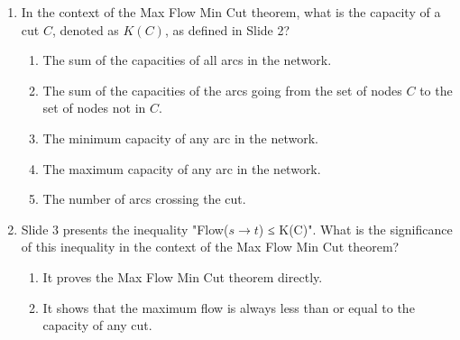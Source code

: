 \documentclass{article}%
\begin{document}
\begin{enumerate}
\begin{enumerate}
\begin{enumerate}
\item By considering the maximum flow and minimum cut capacity explicitly.%
\item By removing the inequality altogether.%
\end{enumerate}%
\vspace{0.5em}%
\item What is the practical significance of the Max Flow Min Cut theorem in solving network flow problems?%
\begin{enumerate}%
\item It simplifies the problem by eliminating the need for linear programming.%
\item It provides an alternative, often more efficient, method for finding the maximum flow compared to directly solving the linear program.%
\item It makes the problem computationally more complex.%
\item It is only applicable to very small networks.%
\item It has no practical significance in solving network flow problems.%
\end{enumerate}%
\vspace{0.5em}%
\end{enumerate}%
\item In the context of the Max Flow Min Cut theorem, what is the capacity of a cut $C$, denoted as $K(C)$, as defined in Slide 2?%
\begin{enumerate}%
\item The sum of the capacities of all arcs in the network.%
\item The sum of the capacities of the arcs going from the set of nodes $C$ to the set of nodes not in $C$.%
\item The minimum capacity of any arc in the network.%
\item The maximum capacity of any arc in the network.%
\item The number of arcs crossing the cut.%
\end{enumerate}%
\vspace{1em}%
\item Slide 3 presents the inequality "Flow($s \to t$) ≤ K(C)". What is the significance of this inequality in the context of the Max Flow Min Cut theorem?%
\begin{enumerate}%
\item It proves the Max Flow Min Cut theorem directly.%
\item It shows that the maximum flow is always less than or equal to the capacity of any cut.%

\end{enumerate}
\end{enumerate}
\end{document}
